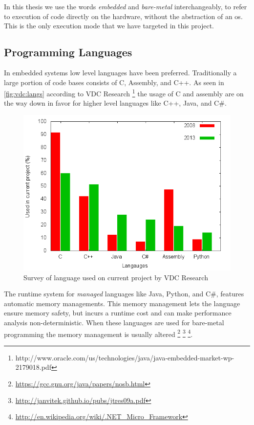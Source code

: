 In this thesis we use the words \emph{embedded} and \emph{bare-metal} interchangeably, to refer to execution of code directly on the hardware, without the abstraction of an \gls{os}.
This is the only execution mode that we have targeted in this project.

\subsection{Programming Languages}

In embedded systems low level languages have been preferred.
Traditionally a large portion of code bases consists of C, Assembly, and C++.
As seen in \autoref{fig:vdc:langs} according to VDC Research \footnote{http://www.oracle.com/us/technologies/java/java-embedded-market-wp-2179018.pdf} the usage of C and assembly are on the way down in favor for higher level languages like C++, Java, and C\#.

\begin{figure}[H]
  \begin{center}
    \includegraphics[scale=0.5]{figures/plots/langs.png}
  \end{center}
  \caption{Survey of language used on current project by VDC Research}
  \label{fig:vdc:langs}
\end{figure}

The runtime system for \emph{managed} languages like Java, Python, and C\#, features automatic memory managements.
This memory management lets the language ensure memory safety, but incurs a runtime cost and can make performance analysis non-deterministic.
When these languages are used for bare-metal programming the memory management is usually altered \footnote{\url{https://gcc.gnu.org/java/papers/nosb.html}} \footnote{\url{http://janvitek.github.io/pubs/jtres09a.pdf}} \footnote{\url{http://en.wikipedia.org/wiki/.NET_Micro_Framework}}.

